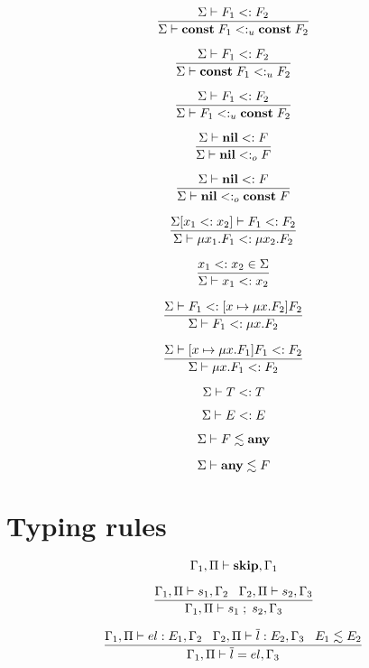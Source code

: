 \[
\dfrac{\Sigma \vdash F_{1} <: F_{2}}
      {\Sigma \vdash \mathbf{const} \; F_{1} <:_{u} \mathbf{const} \; F_{2}}
\]

\[
\dfrac{\Sigma \vdash F_{1} <: F_{2}}
      {\Sigma \vdash \mathbf{const} \; F_{1} <:_{u} F_{2}}
\]

\[
\dfrac{\Sigma \vdash F_{1} <: F_{2}}
      {\Sigma \vdash F_{1} <:_{u} \mathbf{const} \; F_{2}}
\]

\[
\dfrac{\Sigma \vdash \mathbf{nil} <: F}
      {\Sigma \vdash \mathbf{nil} <:_{o} F}
\]

\[
\dfrac{\Sigma \vdash \mathbf{nil} <: F}
      {\Sigma \vdash \mathbf{nil} <:_{o} \mathbf{const} \; F}
\]

\[
\dfrac{\Sigma[x_{1} <: x_{2}] \vdash F_{1} <: F_{2}}
      {\Sigma \vdash \mu x_{1}.F_{1} <: \mu x_{2}.F_{2}}
\]

\[
\dfrac{x_{1} <: x_{2} \in \Sigma}
      {\Sigma \vdash x_{1} <: x_{2}}
\]

\[
\dfrac{\Sigma \vdash F_{1} <: [x \mapsto \mu x.F_{2}]F_{2}}
      {\Sigma \vdash F_{1} <: \mu x.F_{2}}
\]

\[
\dfrac{\Sigma \vdash [x \mapsto \mu x.F_{1}]F_{1} <: F_{2}}
      {\Sigma \vdash \mu x.F_{1} <: F_{2}}
\]

\[
\Sigma \vdash T <: T
\]

\[
\Sigma \vdash E <: E
\]

\[
\Sigma \vdash F \lesssim \mathbf{any}
\]

\[
\Sigma \vdash \mathbf{any} \lesssim F
\]

\section{Typing rules}

\noindent

\[
\Gamma_{1}, \Pi \vdash \mathbf{skip}, \Gamma_{1}
\]

\[
\dfrac{\Gamma_{1}, \Pi \vdash s_{1}, \Gamma_{2} \;\;\;
       \Gamma_{2}, \Pi \vdash s_{2}, \Gamma_{3}}
      {\Gamma_{1}, \Pi \vdash s_{1} \; ; \; s_{2}, \Gamma_{3}}
\]

\[
\dfrac{\Gamma_{1}, \Pi \vdash el:E_{1}, \Gamma_{2} \;\;\;
       \Gamma_{2}, \Pi \vdash \overline{l}:E_{2}, \Gamma_{3} \;\;\;
       E_{1} \lesssim E_{2}}
      {\Gamma_{1}, \Pi \vdash \overline{l} = el,\Gamma_{3}}
\]

